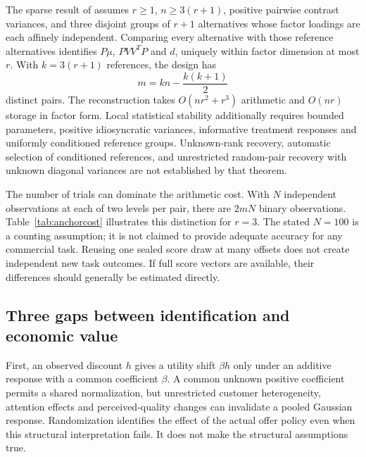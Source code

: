 \documentclass[11pt]{article}
\theoremstyle{remark}\newtheorem{example}{Example}
\begin{document}
The sparse result of \citet{wuebbenident} assumes $r\geq1$,
$n\geq3(r+1)$, positive pairwise contrast variances, and three disjoint groups
of $r+1$ alternatives whose factor loadings are each affinely independent.
Comparing every alternative with those reference alternatives identifies
$P\mu$, $PVV^TP$ and $d$, uniquely within factor dimension at most $r$.
With $k=3(r+1)$ references, the design has
\begin{equation}\label{eq:counts}
 m=kn-\frac{k(k+1)}2
\end{equation}
distinct pairs. The reconstruction takes $O(nr^2+r^3)$ arithmetic and $O(nr)$
storage in factor form. Local statistical stability additionally requires
bounded parameters, positive idiosyncratic variances, informative treatment
responses and uniformly conditioned reference groups. Unknown-rank recovery,
automatic selection of conditioned references, and unrestricted random-pair
recovery with unknown diagonal variances are not established by that theorem.

The number of trials can dominate the arithmetic cost. With $N$ independent
observations at each of two levels per pair, there are $2mN$ binary observations.
Table~\ref{tab:anchorcost} illustrates this distinction for $r=3$. The stated
$N=100$ is a counting assumption; it is not claimed to provide adequate
accuracy for any commercial task. Reusing one sealed score draw at many offsets
does not create independent new task outcomes. If full score vectors are
available, their differences should generally be estimated directly.

\begin{table}[htbp]\centering\small

\caption{Observation counts under the minimum three-group design with twelve
references. Two population probabilities per pair require repeated sampling.}
\label{tab:anchorcost}
\end{table}

\subsection{Three gaps between identification and economic value}
First, an observed discount $h$ gives a utility shift $\beta h$ only under an
additive response with a common coefficient $\beta$. A common unknown positive
coefficient permits a shared normalization, but unrestricted customer
heterogeneity, attention effects and perceived-quality changes can invalidate
a pooled Gaussian response. Randomization identifies the effect of the actual
offer policy even when this structural interpretation fails. It does not make
the structural assumptions true.
\end{document}
